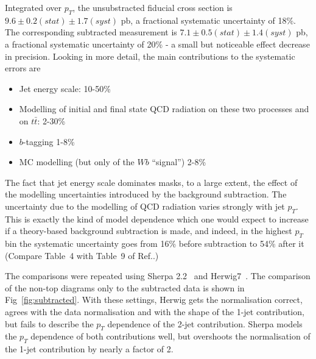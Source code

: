 \documentclass[floatfix]{article}
\begin{document}
Integrated over $p_T$, the unsubstracted fiducial cross section is
$9.6 \pm 0.2 (stat) \pm 1.7 (syst)$ pb, a fractional systematic uncertainty of 18\%.
The corresponding subtracted measurement is 
$7.1 \pm 0.5 (stat) \pm 1.4 (syst)$ pb, a fractional systematic uncertainty of 20\%
- a small but noticeable effect decrease in precision. Looking in more detail, the main contributions 
to the systematic errors are
\begin{itemize}
\item Jet energy scale: 10-50\%
\item Modelling of initial and final state QCD radiation on these two processes and on $t\bar{t}$: 2-30\%
\item $b$-tagging 1-8\%
\item MC modelling (but only of the $Wb$ “signal”) 2-8\%
\end{itemize}
The fact that jet energy scale dominates masks, to a large extent, the effect of the modelling uncertainties introduced by
the background subtraction.
The uncertainty due to the modelling of QCD radiation varies strongly with jet $p_T$. 
This is exactly the kind of model dependence which one would expect to increase if a theory-based background
subtraction is made, and indeed, in the highest $p_T$ bin the systematic uncertainty goes from 16\% before subtraction 
to 54\% after it (Compare Table~4 with Table~9 of Ref.\cite{Aad:2013vka}.) 

The comparisons were repeated using Sherpa 2.2~\cite{} and Herwig7~\cite{}. The comparison of the non-top diagrams only to the subtracted data is shown in Fig~\ref{fig:subtracted}. 
With these settings, Herwig gets the normalisation correct, agrees with the data normalisation and with the shape of the 1-jet contribution, but fails to describe the $p_T$ 
dependence of the 2-jet contribution. Sherpa models the $p_T$ dependence of both contributions well, but overshoots the normalisation of the 1-jet contribution by nearly a 
factor of 2.
\end{document}
